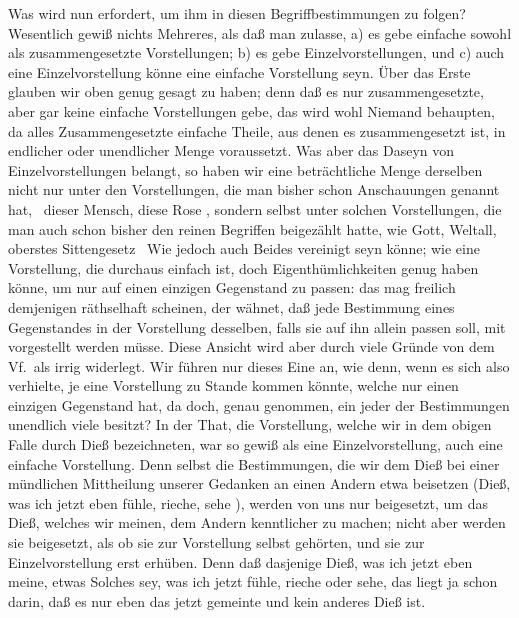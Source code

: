 Was wird nun erfordert, um ihm in diesen Begriffbestimmungen zu folgen? Wesentlich gewiß nichts Mehreres, als daß man zulasse, a) es gebe einfache sowohl als zusammengesetzte Vorstellungen; b) es gebe Einzelvorstellungen, und c) auch eine Einzelvorstellung könne eine einfache Vorstellung seyn. Über das Erste glauben wir oben genug gesagt zu haben; denn daß es nur zusammengesetzte, aber gar keine einfache Vorstellungen gebe, das wird wohl Niemand behaupten, da alles Zusammengesetzte einfache Theile, aus denen es zusammengesetzt ist, in endlicher oder unendlicher Menge voraussetzt. Was aber das Daseyn von Einzelvorstellungen belangt, so haben wir eine beträchtliche Menge derselben nicht nur unter den Vorstellungen, die man bisher schon Anschauungen genannt hat, \zB\ dieser Mensch, diese Rose \udgl , sondern selbst unter solchen Vorstellungen, die man auch schon bisher den reinen Begriffen beigezählt hatte, wie Gott, Weltall, oberstes Sittengesetz \umA\ Wie jedoch auch Beides vereinigt seyn könne; wie eine Vorstellung, die durchaus einfach ist, doch Eigenthümlichkeiten genug haben könne, um nur auf einen einzigen Gegenstand zu passen: das mag freilich demjenigen räthselhaft scheinen, der wähnet, daß jede Bestimmung eines Gegenstandes in der Vorstellung desselben, falls sie auf ihn allein passen soll, mit vorgestellt werden müsse. Diese Ansicht wird aber  durch viele Gründe von dem Vf.\ als irrig widerlegt. Wir führen nur dieses Eine an, wie denn, wenn es sich also  verhielte, je eine Vorstellung zu Stande kommen könnte, welche nur einen einzigen Gegenstand hat, da doch, genau genommen, ein jeder der Bestimmungen unendlich viele besitzt? In der That, die Vorstellung, welche wir in dem obigen Falle durch Dieß bezeichneten, war so gewiß als eine Einzelvorstellung, auch eine einfache Vorstellung. Denn selbst die Bestimmungen, die wir dem Dieß bei einer mündlichen Mittheilung unserer Gedanken an einen Andern etwa beisetzen (Dieß, was ich jetzt eben fühle, rieche, sehe \usw ), werden von uns nur beigesetzt, um das Dieß, welches wir meinen, dem Andern kenntlicher zu machen; nicht aber werden sie beigesetzt, als ob sie zur Vorstellung selbst gehörten, und sie zur Einzelvorstellung erst erhüben. Denn daß dasjenige Dieß, was ich jetzt eben meine, etwas Solches sey, was ich jetzt fühle, rieche oder sehe, das liegt ja schon darin, daß es nur eben das jetzt gemeinte und kein anderes Dieß ist. \par
